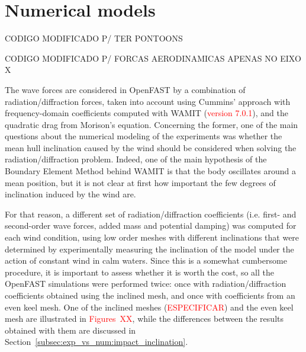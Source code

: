 \section{Numerical models} \label{sec:numerical_models}
CODIGO MODIFICADO P/ TER PONTOONS

CODIGO MODIFICADO P/ FORCAS AERODINAMICAS APENAS NO EIXO X



The wave forces are considered in OpenFAST by a combination of radiation/diffraction forces, taken into account using Cummins' approach \citep{cummins1962,ogilvie1964} with frequency-domain coefficients computed with WAMIT (\textcolor{red}{version 7.0.1}), and the quadratic drag from Morison's equation. Concerning the former, one of the main questions about the numerical modeling of the experiments was whether the mean hull inclination caused by the wind should be considered when solving the radiation/diffraction problem. Indeed, one of the main hypothesis of the Boundary Element Method behind WAMIT is that the body oscillates around a mean position, but it is not clear at first how important the few degrees of inclination induced by the wind are.

For that reason, a different set of radiation/diffraction coefficients (i.e. first- and second-order wave forces, added mass and potential damping) was computed for each wind condition, using low order meshes with different inclinations that were determined by experimentally measuring the inclination of the model under the action of constant wind in calm waters. Since this is a somewhat cumbersome procedure, it is important to assess whether it is worth the cost, so all the OpenFAST simulations were performed twice: once with radiation/diffraction coefficients obtained using the inclined mesh, and once with coefficients from an even keel mesh. One of the inclined meshes (\textcolor{red}{ESPECIFICAR}) and the even keel mesh are illustrated in \textcolor{red}{Figures~XX}, while the differences between the results obtained with them are discussed in Section~\ref{subsec:exp_vs_num:impact_inclination}.
